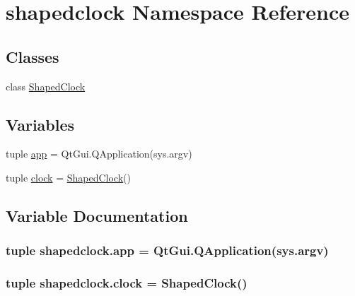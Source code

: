 \hypertarget{namespaceshapedclock}{}\section{shapedclock Namespace Reference}
\label{namespaceshapedclock}
\subsection*{Classes}
\begin{DoxyCompactItemize}
\item 
class \hyperlink{classshapedclock_1_1ShapedClock}{Shaped\+Clock}
\end{DoxyCompactItemize}
\subsection*{Variables}
\begin{DoxyCompactItemize}
\item 
tuple \hyperlink{namespaceshapedclock_a4ef5e09061689364df647ac3436384d0}{app} = Qt\+Gui.\+Q\+Application(sys.\+argv)
\item 
tuple \hyperlink{namespaceshapedclock_a1cdb0ad7aa7101ace30e01ea2b97ebb2}{clock} = \hyperlink{classshapedclock_1_1ShapedClock}{Shaped\+Clock}()
\end{DoxyCompactItemize}


\subsection{Variable Documentation}
\hypertarget{namespaceshapedclock_a4ef5e09061689364df647ac3436384d0}{}
\subsubsection[{app}]{\setlength{\rightskip}{0pt plus 5cm}tuple shapedclock.\+app = Qt\+Gui.\+Q\+Application(sys.\+argv)}\label{namespaceshapedclock_a4ef5e09061689364df647ac3436384d0}
\hypertarget{namespaceshapedclock_a1cdb0ad7aa7101ace30e01ea2b97ebb2}{}
\subsubsection[{clock}]{\setlength{\rightskip}{0pt plus 5cm}tuple shapedclock.\+clock = {\bf Shaped\+Clock}()}\label{namespaceshapedclock_a1cdb0ad7aa7101ace30e01ea2b97ebb2}
